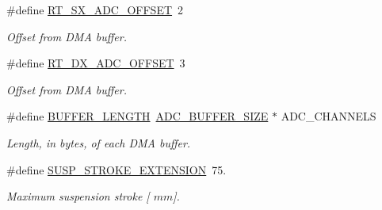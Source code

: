 \begin{DoxyCompactItemize}
\mbox{\label{group___board__model__group_gaf318359d2387fb8fb87719ef9575b4b5}} 
\#define \mbox{\hyperlink{group___board__model__group_gaf318359d2387fb8fb87719ef9575b4b5}{R\+T\+\_\+\+S\+X\+\_\+\+A\+D\+C\+\_\+\+O\+F\+F\+S\+ET}}~2
\begin{DoxyCompactList}\small\item\em Offset from D\+MA buffer. \end{DoxyCompactList}\item 
\mbox{\label{group___board__model__group_gae702ce1b301d77d1f4e9b28d8ba12972}} 
\#define \mbox{\hyperlink{group___board__model__group_gae702ce1b301d77d1f4e9b28d8ba12972}{R\+T\+\_\+\+D\+X\+\_\+\+A\+D\+C\+\_\+\+O\+F\+F\+S\+ET}}~3
\begin{DoxyCompactList}\small\item\em Offset from D\+MA buffer. \end{DoxyCompactList}\item 
\mbox{\label{group___board__model__group_gaf7b7dc9a200cb1404c280bd500fd1551}} 
\#define \mbox{\hyperlink{group___board__model__group_gaf7b7dc9a200cb1404c280bd500fd1551}{B\+U\+F\+F\+E\+R\+\_\+\+L\+E\+N\+G\+TH}}~\mbox{\hyperlink{group___board__model__group_ga602abb8ec84dcb3b6f854a738310ea46}{A\+D\+C\+\_\+\+B\+U\+F\+F\+E\+R\+\_\+\+S\+I\+ZE}} $\ast$ A\+D\+C\+\_\+\+C\+H\+A\+N\+N\+E\+LS
\begin{DoxyCompactList}\small\item\em Length, in bytes, of each D\+MA buffer. \end{DoxyCompactList}\item 
\mbox{\label{group___board__model__group_gafd34b4e5a1067ffe9bfb1cb18b5973e6}} 
\#define \mbox{\hyperlink{group___board__model__group_gafd34b4e5a1067ffe9bfb1cb18b5973e6}{S\+U\+S\+P\+\_\+\+S\+T\+R\+O\+K\+E\+\_\+\+E\+X\+T\+E\+N\+S\+I\+ON}}~75.
\begin{DoxyCompactList}\small\item\em Maximum suspension stroke \mbox{[} $mm$\mbox{]}. \end{DoxyCompactList}\end{DoxyCompactItemize}
